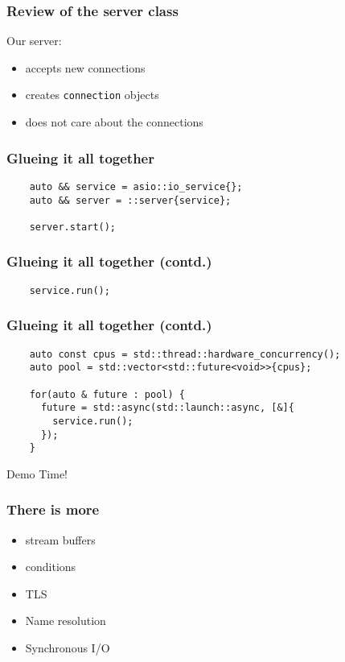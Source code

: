 \begin{frame}
  \frametitle{Review of the server class}
  Our server:\pause{}
  \begin{itemize}
    \item{accepts new connections}\pause{}
    \item{creates \texttt{connection} objects}\pause{}
    \item{does not care about the connections}
  \end{itemize}
\end{frame}

\begin{frame}[fragile]
  \frametitle{Glueing it all together}
  \begin{verbatim}
    auto && service = asio::io_service{};
    auto && server = ::server{service};

    server.start();
  \end{verbatim}
\end{frame}

\begin{frame}[fragile]
  \frametitle{Glueing it all together (contd.)}
  \begin{verbatim}
    service.run();
  \end{verbatim}
\end{frame}

\begin{frame}[fragile]
  \frametitle{Glueing it all together (contd.)}
  \begin{verbatim}
    auto const cpus = std::thread::hardware_concurrency();
    auto pool = std::vector<std::future<void>>{cpus};

    for(auto & future : pool) {
      future = std::async(std::launch::async, [&]{
        service.run();
      });
    }
  \end{verbatim}
\end{frame}

\begin{frame}
  \begin{center}
    \Huge{Demo Time!}
  \end{center}
\end{frame}

\begin{frame}
  \frametitle{There is more}
  \begin{itemize}
    \item{stream buffers}\pause{}
    \item{conditions}\pause{}
    \item{TLS}\pause{}
    \item{Name resolution}\pause{}
    \item{Synchronous I/O}
  \end{itemize}
\end{frame}
